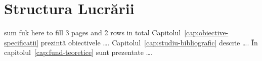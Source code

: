 \section {Structura Lucrării}
sum fuk here to fill 3 pages and 2 rows in total
Capitolul~\ref{cap:obiective-specificatii} prezintă obiectivele \dots. Capitolul~\ref{cap:studiu-bibliografic} descrie \dots. În capitolul~\ref{cap:fund-teoretice} sunt prezentate \dots.
